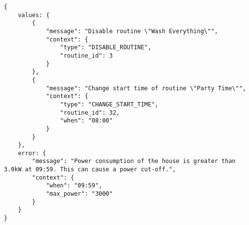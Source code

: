 \begin{lstlisting}[language=numbered,caption={Response to HTTP POST request to the \textit{/simulate} endpoint},label=code:api_response_simulate,float,floatplacement=H]
{
    values: {
        {
            "message": "Disable routine \"Wash Everything\"",
            "context": {
                "type": "DISABLE_ROUTINE",
                "routine_id": 3
            }
        },
        {
            "message": "Change start time of routine \"Party Time\"",
            "context": {
                "type": "CHANGE_START_TIME",
                "routine_id": 32,
                "when": "08:00"
            }
        }
    },
    error: {
        "message": "Power consumption of the house is greater than 3.0kW at 09:59. This can cause a power cut-off.",
        "context": {
            "when": "09:59",
            "max_power": "3000"
        }
    }
}
\end{lstlisting}